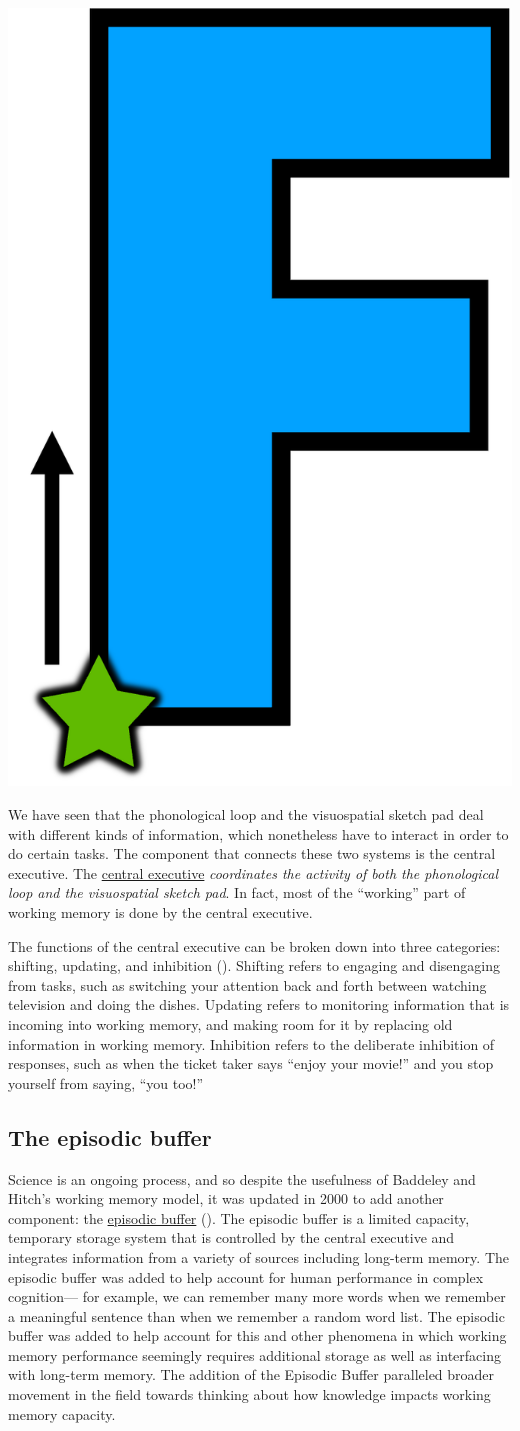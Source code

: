\documentclass[
]{krantz}
\begin{document}
\begin{center}\includegraphics[width=0.1\linewidth]{images/ch4/fig3} \end{center}

We have seen that the phonological loop and the visuospatial sketch pad deal with different kinds of information, which nonetheless have to interact in order to do certain tasks. The component that connects these two systems is the central executive. The \hyperref[central-executive]{central executive} \emph{coordinates the activity of both the phonological loop and the visuospatial sketch pad}. In fact, most of the ``working'' part of working memory is done by the central executive.

The functions of the central executive can be broken down into three categories: shifting, updating, and inhibition (). Shifting refers to engaging and disengaging from tasks, such as switching your attention back and forth between watching television and doing the dishes. Updating refers to monitoring information that is incoming into working memory, and making room for it by replacing old information in working memory. Inhibition refers to the deliberate inhibition of responses, such as when the ticket taker says ``enjoy your movie!'' and you stop yourself from saying, ``you too!''

\subsection*{The episodic buffer}\label{the-episodic-buffer}


Science is an ongoing process, and so despite the usefulness of Baddeley and Hitch's working memory model, it was updated in 2000 to add another component: the \hyperref[episodic-buffer]{episodic buffer} (). The episodic buffer is a limited capacity, temporary storage system that is controlled by the central executive and integrates information from a variety of sources including long-term memory. The episodic buffer was added to help account for human performance in complex cognition--- for example, we can remember many more words when we remember a meaningful sentence than when we remember a random word list. The episodic buffer was added to help account for this and other phenomena in which working memory performance seemingly requires additional storage as well as interfacing with long-term memory. The addition of the Episodic Buffer paralleled broader movement in the field towards thinking about how knowledge impacts working memory capacity.
\end{document}
